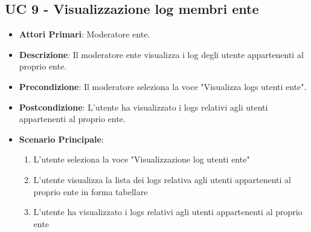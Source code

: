 		\subsection{UC 9 - Visualizzazione log membri ente}
		\begin{itemize}
			\item \textbf{Attori Primari}: Moderatore ente.
			\item \textbf{Descrizione}: Il moderatore ente visualizza i log degli utente appartenenti al proprio ente.
			\item \textbf{Precondizione}: Il moderatore seleziona la voce "Visualizza logs utenti ente".
			\item \textbf{Postcondizione}: L'utente ha visualizzato i logs relativi agli utenti appartenenti al proprio ente.
			\item \textbf{Scenario Principale}:
			\begin{enumerate}
				\item{L'utente seleziona la voce "Visualizzazione log utenti ente"}
				\item{L'utente visualizza la lista dei logs relativa agli utenti appartenenti al proprio ente in forma tabellare}
				\item{L'utente ha visualizzato i logs relativi agli utenti appartenenti al proprio ente}
			\end{enumerate}	
		\end{itemize}


		



		



		


